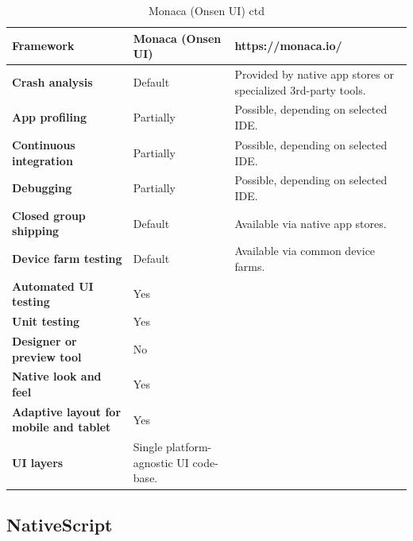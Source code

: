 \documentclass[english,master,public,dept460,male,cpdeclaration,oneside]{diploma}
\begin{document}
\begin{table}[!h]
	\centering
	\caption{Monaca (Onsen UI) ctd}
	\begin{tabular}{p{} | p{} | p{}}
		\toprule		
		\textbf{Framework} & \textbf{Monaca (Onsen UI)} & https://monaca.io/ \\
		\midrule
		\textbf{Crash analysis} & Default & Provided by native app stores or specialized 3rd-party tools. \\			
		\midrule
		\textbf{App profiling} & Partially & Possible, depending on selected IDE. \\			
		\midrule
		\textbf{Continuous integration} & Partially & Possible, depending on selected IDE. \\			
		\midrule
		\textbf{Debugging} & Partially & Possible, depending on selected IDE. \\			
		\midrule
		\textbf{Closed group shipping} & Default & Available via native app stores. \\			
		\midrule
		\textbf{Device farm testing} & Default & Available via common device farms. \\			
		\midrule
		\textbf{Automated UI testing} & Yes & \\			
		\midrule
		\textbf{Unit testing} & Yes & \\			
		\midrule
		\textbf{Designer or preview tool} & No & \\			
		\midrule
		\textbf{Native look and feel} & Yes & \\			
		\midrule
		\textbf{Adaptive layout for mobile and tablet} & Yes & \\			
		\midrule		
		\textbf{UI layers} & Single platform-agnostic UI code-base. &  \\			
		\midrule
	\end{tabular}
\end{table}

\clearpage
\subsection{NativeScript}
\end{document}
